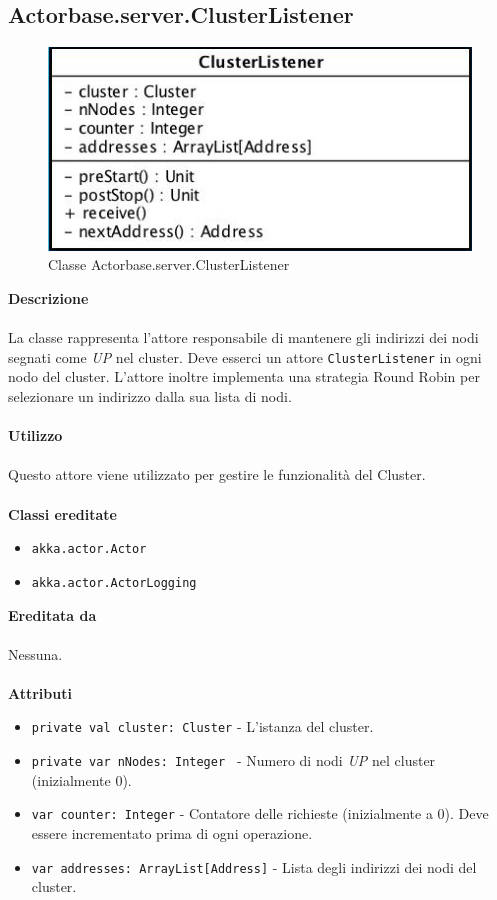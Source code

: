 \documentclass[a4paper]{article}
\begin{document}
		\subsection{Actorbase.server.ClusterListener }
		\begin{figure}[H]
			\centering
			\includegraphics[scale=0.5]{Server/clusterListenerClass.jpg}
			\caption{Classe Actorbase.server.ClusterListener}
		\end{figure}
		\textbf{Descrizione}
			\\ \\
			La classe rappresenta l'attore responsabile di mantenere gli indirizzi dei nodi segnati come \emph{UP} nel cluster. Deve esserci un attore \texttt{ClusterListener} in ogni nodo del cluster. L'attore inoltre implementa una strategia Round Robin per selezionare un indirizzo dalla sua lista di nodi.
			\\ \\
		\textbf{Utilizzo}
			\\ \\
			Questo attore viene utilizzato per gestire le funzionalità del Cluster.
			\\ \\
		\textbf{Classi ereditate}
			\begin{itemize}
				\item \texttt{akka.actor.Actor}
				\item \texttt{akka.actor.ActorLogging}
			\end{itemize}
		\textbf{Ereditata da}
			\\ \\
			Nessuna.
			\\ \\
		\textbf{Attributi}
			\begin{itemize}
				\item \texttt{private val cluster: Cluster} - L'istanza del cluster.
				\item \texttt{private var nNodes: Integer } - Numero di nodi \emph{UP} nel cluster (inizialmente 0).
				\item \texttt{var counter: Integer} - Contatore delle richieste (inizialmente a 0). Deve essere incrementato prima di ogni operazione.
				\item \texttt{var addresses: ArrayList[Address]} - Lista degli indirizzi dei nodi del cluster.
			\end{itemize}
\end{document}
